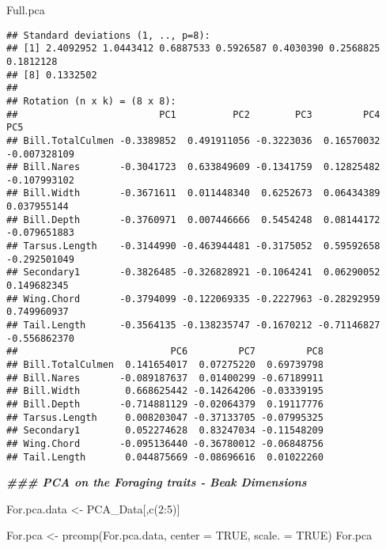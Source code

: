 \documentclass[
]{article}
\newenvironment{Shaded}{\begin{snugshade}}{\end{snugshade}}
\newcommand{\AttributeTok}[1]{\textcolor[rgb]{0.77,0.63,0.00}{#1}}
\newcommand{\ConstantTok}[1]{\textcolor[rgb]{0.00,0.00,0.00}{#1}}
\newcommand{\DecValTok}[1]{\textcolor[rgb]{0.00,0.00,0.81}{#1}}
\newcommand{\DocumentationTok}[1]{\textcolor[rgb]{0.56,0.35,0.01}{\textbf{\textit{#1}}}}
\newcommand{\FunctionTok}[1]{\textcolor[rgb]{0.00,0.00,0.00}{#1}}
\newcommand{\NormalTok}[1]{#1}
\newcommand{\OtherTok}[1]{\textcolor[rgb]{0.56,0.35,0.01}{#1}}
\newcommand{\SpecialCharTok}[1]{\textcolor[rgb]{0.00,0.00,0.00}{#1}}
\begin{document}
\begin{Shaded}
\begin{Highlighting}[]
\NormalTok{Full.pca}
\end{Highlighting}
\end{Shaded}

\begin{verbatim}
## Standard deviations (1, .., p=8):
## [1] 2.4092952 1.0443412 0.6887533 0.5926587 0.4030390 0.2568825 0.1812128
## [8] 0.1332502
## 
## Rotation (n x k) = (8 x 8):
##                         PC1          PC2        PC3         PC4          PC5
## Bill.TotalCulmen -0.3389852  0.491911056 -0.3223036  0.16570032 -0.007328109
## Bill.Nares       -0.3041723  0.633849609 -0.1341759  0.12825482 -0.107993102
## Bill.Width       -0.3671611  0.011448340  0.6252673  0.06434389  0.037955144
## Bill.Depth       -0.3760971  0.007446666  0.5454248  0.08144172 -0.079651883
## Tarsus.Length    -0.3144990 -0.463944481 -0.3175052  0.59592658 -0.292501049
## Secondary1       -0.3826485 -0.326828921 -0.1064241  0.06290052  0.149682345
## Wing.Chord       -0.3794099 -0.122069335 -0.2227963 -0.28292959  0.749960937
## Tail.Length      -0.3564135 -0.138235747 -0.1670212 -0.71146827 -0.556862370
##                           PC6         PC7         PC8
## Bill.TotalCulmen  0.141654017  0.07275220  0.69739798
## Bill.Nares       -0.089187637  0.01400299 -0.67189911
## Bill.Width        0.668625442 -0.14264206 -0.03339195
## Bill.Depth       -0.714881129 -0.02064379  0.19117776
## Tarsus.Length     0.008203047 -0.37133705 -0.07995325
## Secondary1        0.052274628  0.83247034 -0.11548209
## Wing.Chord       -0.095136440 -0.36780012 -0.06848756
## Tail.Length       0.044875669 -0.08696616  0.01022260
\end{verbatim}

\begin{Shaded}
\begin{Highlighting}[]
\DocumentationTok{\#\#\# PCA on the Foraging traits {-} Beak Dimensions}

\NormalTok{For.pca.data }\OtherTok{\textless{}{-}}\NormalTok{ PCA\_Data[,}\FunctionTok{c}\NormalTok{(}\DecValTok{2}\SpecialCharTok{:}\DecValTok{5}\NormalTok{)]}

\NormalTok{For.pca }\OtherTok{\textless{}{-}} \FunctionTok{prcomp}\NormalTok{(For.pca.data, }\AttributeTok{center =} \ConstantTok{TRUE}\NormalTok{, }\AttributeTok{scale. =} \ConstantTok{TRUE}\NormalTok{)}
\NormalTok{For.pca}
\end{Highlighting}
\end{Shaded}
\end{document}

